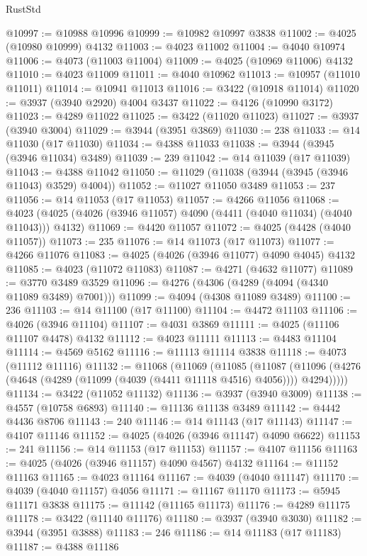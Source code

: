 \begin{lexlean}{RustStd}
\begin{coremodule}
@10997 := @10988 @10996
@10999 := @10982 @10997 @3838
@11002 := @4025 (@10980 @10999) @4132
@11003 := @4023 @11002
@11004 := @4040 @10974
@11006 := @4073 (@11003 @11004)
@11009 := @4025 (@10969 @11006) @4132
@11010 := @4023 @11009
@11011 := @4040 @10962
@11013 := @10957 (@11010 @11011)
@11014 := @10941 @11013
@11016 := @3422 (@10918 @11014)
@11020 := @3937 (@3940 @2920) @4004 @3437
@11022 := @4126 (@10990 @3172)
@11023 := @4289 @11022
@11025 := @3422 (@11020 @11023)
@11027 := @3937 (@3940 @3004)
@11029 := @3944 (@3951 @3869)
@11030 := 238
@11033 := @14 @11030 (@17 @11030)
@11034 := @4388 @11033
@11038 := @3944 (@3945 (@3946 @11034) @3489)
@11039 := 239
@11042 := @14 @11039 (@17 @11039)
@11043 := @4388 @11042
@11050 := @11029 (@11038 (@3944 (@3945 (@3946 @11043) @3529) @4004))
@11052 := @11027 @11050 @3489
@11053 := 237
@11056 := @14 @11053 (@17 @11053)
@11057 := @4266 @11056
@11068 := @4023 (@4025 (@4026 (@3946 @11057) @4090 (@4411 (@4040 @11034) (@4040 @11043))) @4132)
@11069 := @4420 @11057
@11072 := @4025 (@4428 (@4040 @11057))
@11073 := 235
@11076 := @14 @11073 (@17 @11073)
@11077 := @4266 @11076
@11083 := @4025 (@4026 (@3946 @11077) @4090 @4045) @4132
@11085 := @4023 (@11072 @11083)
@11087 := @4271 (@4632 @11077)
@11089 := @3770 @3489 @3529
@11096 := @4276 (@4306 (@4289 (@4094 (@4340 @11089 @3489) @7001)))
@11099 := @4094 (@4308 @11089 @3489)
@11100 := 236
@11103 := @14 @11100 (@17 @11100)
@11104 := @4472 @11103
@11106 := @4026 (@3946 @11104)
@11107 := @4031 @3869
@11111 := @4025 (@11106 @11107 @4478) @4132
@11112 := @4023 @11111
@11113 := @4483 @11104
@11114 := @4569 @5162
@11116 := @11113 @11114 @3838
@11118 := @4073 (@11112 @11116)
@11132 := @11068
    (@11069
      (@11085
        (@11087
          (@11096 (@4276 (@4648 (@4289 (@11099 (@4039 (@4411 @11118 @4516) @4056)))) @4294)))))
@11134 := @3422 (@11052 @11132)
@11136 := @3937 (@3940 @3009)
@11138 := @4557 (@10758 @6893)
@11140 := @11136 @11138 @3489
@11142 := @4442 @4436 @8706
@11143 := 240
@11146 := @14 @11143 (@17 @11143)
@11147 := @4107 @11146
@11152 := @4025 (@4026 (@3946 @11147) @4090 @6622)
@11153 := 241
@11156 := @14 @11153 (@17 @11153)
@11157 := @4107 @11156
@11163 := @4025 (@4026 (@3946 @11157) @4090 @4567) @4132
@11164 := @11152 @11163
@11165 := @4023 @11164
@11167 := @4039 (@4040 @11147)
@11170 := @4039 (@4040 @11157) @4056
@11171 := @11167 @11170
@11173 := @5945 @11171 @3838
@11175 := @11142 (@11165 @11173)
@11176 := @4289 @11175
@11178 := @3422 (@11140 @11176)
@11180 := @3937 (@3940 @3030)
@11182 := @3944 (@3951 @3888)
@11183 := 246
@11186 := @14 @11183 (@17 @11183)
@11187 := @4388 @11186

\end{coremodule}
\end{lexlean}
